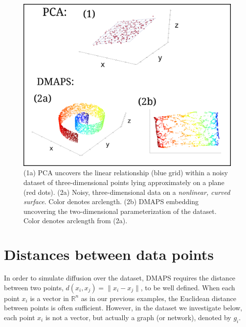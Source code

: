 \documentclass[11pt]{article}
\begin{document}
\begin{figure}
  \begin{center}
    \includegraphics[width=1.0\textwidth]{dim_red}
    \caption{(1a) PCA uncovers the linear relationship (blue grid) within a noisy dataset of three-dimensional points lying approximately on a plane (red dots). (2a) Noisy, three-dimensional data on a \textit{nonlinear, curved surface}. Color denotes arclength. (2b) DMAPS embedding uncovering the two-dimensional parameterization of the dataset. Color denotes arclength from (2a).}    %
  \end{center}
\end{figure}

\clearpage


\section{Distances between data points}
In order to simulate diffusion over the dataset, DMAPS requires the distance between two points, $d(x_i, x_j) = \| x_i - x_j \|$, to be well defined. When each point $x_i$ is a vector in $\mathbb{R}^n$ as in our previous examples, the Euclidean distance between points is often sufficient. However, in the dataset we investigate below, each point $x_i$ is not a vector, but actually a graph (or network), denoted by $g_i$.
\end{document}
